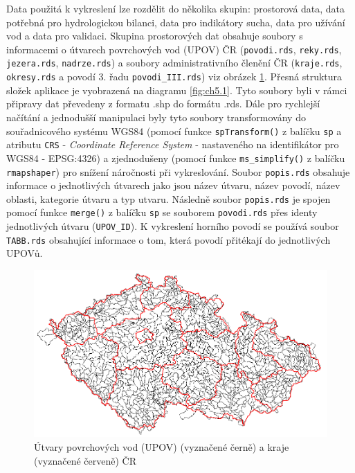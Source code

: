 \documentclass[12pt,]{article}
\begin{document}
\qquad Data použitá k vykreslení lze rozdělit do několika skupin:
prostorová data, data potřebná pro hydrologickou bilanci, data pro
indikátory sucha, data pro užívání vod a data pro validaci. Skupina
prostorových dat obsahuje soubory s informacemi o útvarech povrchových
vod (UPOV) ČR (\texttt{povodi.rds}, \texttt{reky.rds},
\texttt{jezera.rds}, \texttt{nadrze.rds}) a soubory administrativního
členění ČR (\texttt{kraje.rds}, \texttt{okresy.rds} a povodí 3. řadu
\texttt{povodi\_III.rds}) viz obrázek \ref{fig:ch5.0}. Přesná struktura
složek aplikace je vyobrazená na diagramu \ref{fig:ch5.1}. Tyto soubory
byli v rámci připravy dat převedeny z formatu .shp do formátu .rds. Dále
pro rychlejší načítání a jednodušší manipulaci byly tyto soubory
transformovány do souřadnicového systému WGS84 (pomocí funkce
\texttt{spTransform()} z balíčku \texttt{sp} a atributu \texttt{CRS} -
\emph{Coordinate Reference System} - nastaveného na identifikátor pro
WGS84 - EPSG:4326) a zjednodušeny (pomocí funkce \texttt{ms\_simplify()}
z balíčku \texttt{rmapshaper}) pro snížení náročnosti při vykreslování.
Soubor \texttt{popis.rds} obsahuje informace o jednotlivých útvarech
jako jsou název útvaru, název povodí, název oblasti, kategorie útvaru a
typ utvaru. Následně soubor \texttt{popis.rds} je spojen pomocí funkce
\texttt{merge()} z balíčku \texttt{sp} se souborem \texttt{povodi.rds}
přes identy jednotlivých útvaru (\texttt{UPOV\_ID}). K vykreslení
horního povodí se používá soubor \texttt{TABB.rds} obsahující informace
o tom, která povodí přitékají do jednotlivých UPOVů.

\begin{figure}[H]
      \includegraphics[width=\textwidth]{fig/povodi-kraje}
      \caption{Útvary povrchových vod (UPOV) (vyznačené černě) a kraje (vyznačené červeně) ČR}
      \label{fig:ch5.0}
\end{figure}
\end{document}
